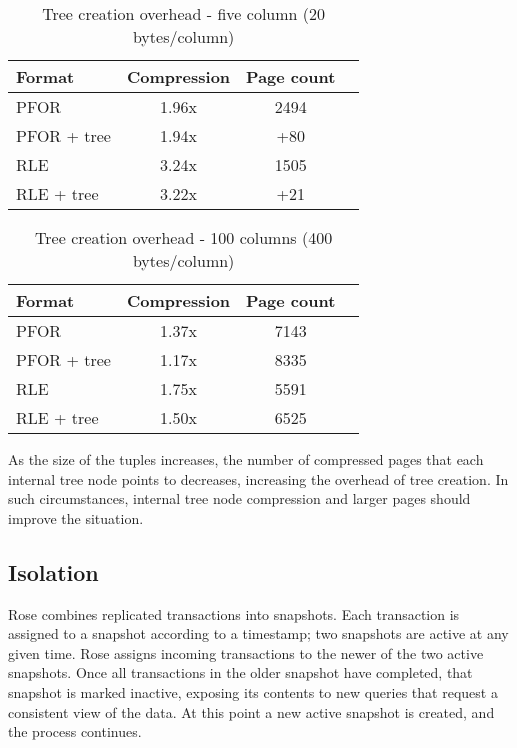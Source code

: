 \documentclass{vldb}
\newcommand{\rows}{Rose\xspace}
\begin{document}
\begin{table}
\caption{Tree creation overhead - five column (20 bytes/column)}
\centering
\label{table:treeCreation}
\begin{tabular}{|l|c|c|c|} \hline
Format     & Compression & Page count \\ \hline %
PFOR        & 1.96x       & 2494       \\ \hline %
PFOR + tree & 1.94x       & +80        \\ \hline %
RLE        & 3.24x       & 1505 \\ \hline %
RLE + tree & 3.22x       & +21        \\  %
\hline\end{tabular}
\end{table}
\begin{table}
\caption{Tree creation overhead - 100 columns (400 bytes/column)}
\centering
\label{table:treeCreationTwo}
\begin{tabular}{|l|c|c|c|} \hline
Format     & Compression & Page count \\ \hline %
PFOR        & 1.37x       & 7143       \\ \hline %
PFOR + tree & 1.17x       & 8335        \\ \hline %
RLE        & 1.75x       & 5591 \\ \hline %
RLE + tree & 1.50x       & 6525        \\  %

\hline\end{tabular}
\end{table}

As the size of the tuples increases, the number of compressed pages
that each internal tree node points to decreases, increasing the
overhead of tree creation.  In such circumstances, internal tree node
compression and larger pages should improve the situation.

\subsection{Isolation}
\label{sec:isolation}
\rows combines replicated transactions into snapshots.  Each transaction
is assigned to a snapshot according to a timestamp; two snapshots are
active at any given time.  \rows assigns incoming transactions to the
newer of the two active snapshots.  Once all transactions in the older
snapshot have completed, that snapshot is marked inactive, exposing
its contents to new queries that request a consistent view of the
data.  At this point a new active snapshot is created, and the process
continues.
\end{document}
